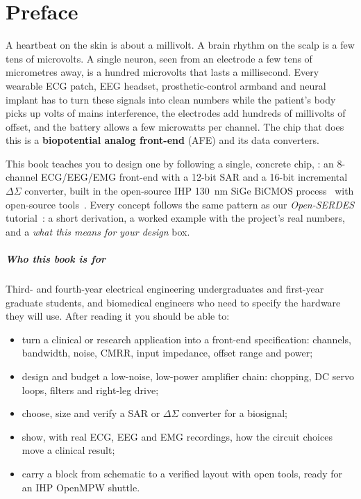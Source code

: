 \chapter{Preface}\label{ch:preface}

A heartbeat on the skin is about a millivolt. A brain rhythm on the scalp is a few tens of microvolts. A single neuron, seen from an electrode a few tens of micrometres away, is a hundred microvolts that lasts a millisecond. Every wearable ECG patch, EEG headset, prosthetic-control armband and neural implant has to turn these signals into clean numbers while the patient's body picks up volts of mains interference, the electrodes add hundreds of millivolts of offset, and the battery allows a few microwatts per channel. The chip that does this is a \textbf{biopotential analog front-end} (AFE) and its data converters.

This book teaches you to design one by following a single, concrete chip, \textbf{\OB{}}: an 8-channel ECG/EEG/EMG front-end with a 12-bit SAR and a 16-bit incremental $\Delta\Sigma$ converter, built in the open-source IHP \sgx{} \qty{130}{\nano\meter} SiGe BiCMOS process~\cite{ihppdk} with open-source tools~\cite{iicosic}. Every concept follows the same pattern as our \emph{Open-SERDES} tutorial~\cite{serdestut}: a short derivation, a worked example with the project's real numbers, and a \emph{what this means for your design} box.

\paragraph{Who this book is for} Third- and fourth-year electrical engineering undergraduates and first-year graduate students, and biomedical engineers who need to specify the hardware they will use. After reading it you should be able to:
\begin{itemize}
  \item turn a clinical or research application into a front-end specification: channels, bandwidth, noise, CMRR, input impedance, offset range and power;
  \item design and budget a low-noise, low-power amplifier chain: chopping, DC servo loops, filters and right-leg drive;
  \item choose, size and verify a SAR or $\Delta\Sigma$ converter for a biosignal;
  \item show, with real ECG, EEG and EMG recordings, how the circuit choices move a clinical result;
  \item carry a block from schematic to a verified layout with open tools, ready for an IHP OpenMPW shuttle.
\end{itemize}

